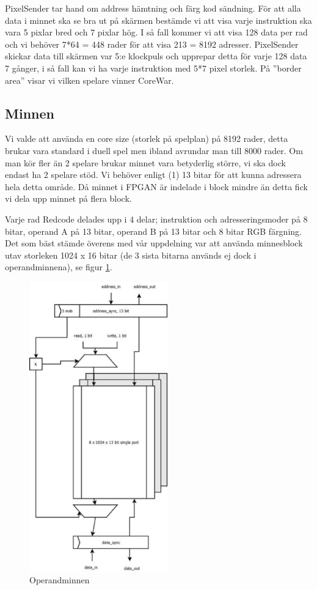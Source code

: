 \documentclass[11pt]{article}
\begin{document}
PixelSender tar hand om address hämtning och färg kod sändning. För att alla data i minnet ska se bra ut på skärmen bestämde vi att visa varje instruktion ska vara 5 pixlar bred och 7 pixlar hög. I så fall kommer vi att visa 128 data per rad och vi behöver 7*64 = 448 rader för att visa 213 = 8192 adresser. PixelSender skickar data till skärmen var 5:e klockpuls och upprepar detta för varje 128 data 7 gånger, i så fall kan vi ha varje instruktion med 5*7 pixel storlek. På ”border area” visar vi vilken spelare vinner CoreWar.

\newpage
\subsection{Minnen}

Vi valde att använda en core size (storlek på spelplan) på 8192 rader, detta brukar vara standard i duell spel men ibland avrundar man till 8000 rader. Om man kör fler än 2 spelare brukar minnet vara betyderlig större, vi ska dock endast ha 2 spelare stöd. Vi behöver enligt (1) 13 bitar för att kunna adressera hela detta område. Då minnet i FPGAN är indelade i block mindre än detta fick vi dela upp minnet på flera block.

Varje rad Redcode delades upp i 4 delar; instruktion och adresseringsmoder på 8 bitar, operand A på 13 bitar, operand B på 13 bitar och 8 bitar RGB färgning. Det som bäst stämde överens med vår uppdelning var att använda minnesblock utav storleken 1024 x 16 bitar (de 3 sista bitarna används ej dock i operandminnena), se figur \ref{fig:memory_cell}.

\begin{figure}[h]
    \begin{center}
        \includegraphics[width=6cm]{memory_cell.eps}
        \caption{Operandminnen}
        \label{fig:memory_cell}
    \end{center}
\end{figure}
\end{document}
